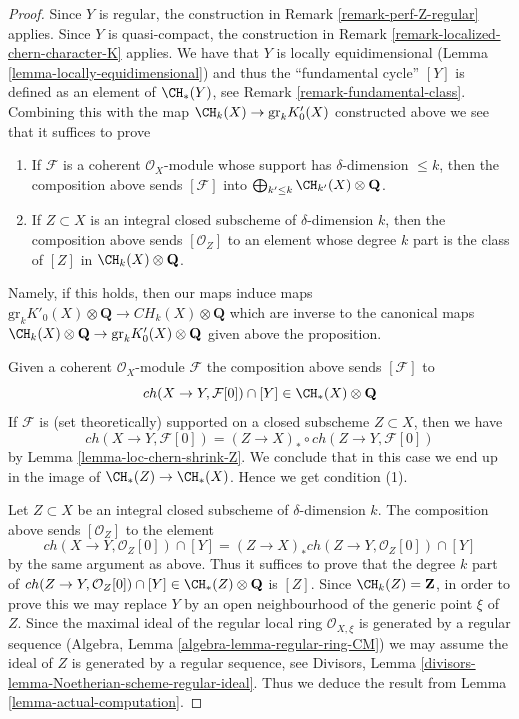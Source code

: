 \begin{proof}
Since $Y$ is regular, the construction in
Remark \ref{remark-perf-Z-regular} applies.
Since $Y$ is quasi-compact, the construction in
Remark \ref{remark-localized-chern-character-K} applies.
We have that $Y$ is locally equidimensional
(Lemma \ref{lemma-locally-equidimensional}) and
thus the ``fundamental cycle'' $[Y]$ is defined
as an element of $\CH_*(Y)$, see Remark \ref{remark-fundamental-class}.
Combining this with the map $\CH_k(X) \to \text{gr}_kK'_0(X)$
constructed above we see that it suffices to prove
\begin{enumerate}
\item If $\mathcal{F}$ is a coherent $\mathcal{O}_X$-module
whose support has $\delta$-dimension $\leq k$, then
the composition above sends $[\mathcal{F}]$ into
$\bigoplus_{k' \leq k} \CH_{k'}(X) \otimes \mathbf{Q}$.
\item If $Z \subset X$ is an integral closed subscheme
of $\delta$-dimension $k$, then the composition above
sends $[\mathcal{O}_Z]$ to an element whose degree $k$
part is the class of $[Z]$ in $\CH_k(X) \otimes \mathbf{Q}$.
\end{enumerate}
Namely, if this holds, then our maps induce maps
$\text{gr}_kK'_0(X) \otimes \mathbf{Q} \to CH_k(X) \otimes \mathbf{Q}$
which are inverse to the canonical maps 
$\CH_k(X) \otimes \mathbf{Q} \to \text{gr}_k K'_0(X) \otimes \mathbf{Q}$
given above the proposition.

\medskip\noindent
Given a coherent $\mathcal{O}_X$-module $\mathcal{F}$
the composition above sends $[\mathcal{F}]$ to
$$
ch(X \to Y, \mathcal{F}[0]) \cap [Y] \in \CH_*(X) \otimes \mathbf{Q}
$$
If $\mathcal{F}$ is (set theoretically) supported on a closed subscheme
$Z \subset X$, then we have
$$
ch(X \to Y, \mathcal{F}[0]) = (Z \to X)_* \circ ch(Z \to Y, \mathcal{F}[0])
$$
by Lemma \ref{lemma-loc-chern-shrink-Z}. We conclude that in this
case we end up in the image of $\CH_*(Z) \to \CH_*(X)$. Hence
we get condition (1).

\medskip\noindent
Let $Z \subset X$ be an integral closed subscheme of $\delta$-dimension $k$.
The composition above sends $[\mathcal{O}_Z]$ to the element
$$
ch(X \to Y, \mathcal{O}_Z[0]) \cap [Y] =
(Z \to X)_* ch(Z \to Y, \mathcal{O}_Z[0]) \cap [Y]
$$
by the same argument as above.
Thus it suffices to prove that the degree $k$ part of
$ch(Z \to Y, \mathcal{O}_Z[0]) \cap [Y] \in
\CH_*(Z) \otimes \mathbf{Q}$ is $[Z]$.
Since $\CH_k(Z) = \mathbf{Z}$, in order
to prove this we may replace $Y$ by an open neighbourhood of the
generic point $\xi$ of $Z$. Since the maximal ideal of the regular
local ring $\mathcal{O}_{X, \xi}$ is generated by a
regular sequence (Algebra, Lemma \ref{algebra-lemma-regular-ring-CM})
we may assume the ideal of $Z$ is generated by a regular sequence, see
Divisors, Lemma \ref{divisors-lemma-Noetherian-scheme-regular-ideal}.
Thus we deduce the result from Lemma \ref{lemma-actual-computation}.
\end{proof}
